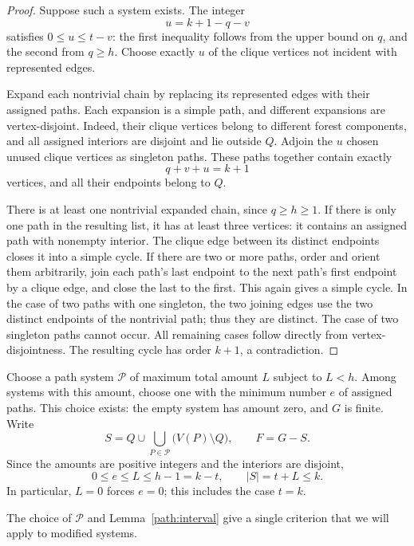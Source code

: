 \begin{proof}
Suppose such a system exists. The integer
\[
 u=k+1-q-v
\]
satisfies $0\leq u\leq t-v$: the first inequality follows from the upper
bound on $q$, and the second from $q\geq h$. Choose exactly $u$ of the
clique vertices not incident with represented edges.

Expand each nontrivial chain by replacing its represented edges with
their assigned paths. Each expansion is a simple path, and different
expansions are vertex-disjoint. Indeed, their clique vertices belong to
different forest components, and all assigned interiors are disjoint and
lie outside $Q$. Adjoin the $u$ chosen unused clique vertices as singleton
paths. These paths together contain exactly
\[
 q+v+u=k+1
\]
vertices, and all their endpoints belong to $Q$.

There is at least one nontrivial expanded chain, since $q\geq h\geq1$.
If there is only one path in the resulting list, it has at least three
vertices: it contains an assigned path with nonempty interior. The clique
edge between its distinct endpoints closes it into a simple cycle. If
there are two or more paths, order and orient them arbitrarily, join each
path's last endpoint to the next path's first endpoint by a clique edge,
and close the last to the first. This again gives a simple cycle. In the
case of two paths with one singleton, the two joining edges use the two
distinct endpoints of the nontrivial path; thus they are distinct. The
case of two singleton paths cannot occur. All remaining cases follow
directly from vertex-disjointness. The resulting cycle has order $k+1$,
a contradiction.
\end{proof}

Choose a path system $\mathcal P$ of maximum total amount $L$ subject to
$L<h$. Among systems with this amount, choose one with the minimum number
$e$ of assigned paths. This choice exists: the empty system has amount
zero, and $G$ is finite. Write
\begin{equation}\label{path:system-vertices}
 S=Q\cup\bigcup_{P\in\mathcal P}\bigl(V(P)\setminus Q\bigr),
 \qquad F=G-S.
\end{equation}
Since the amounts are positive integers and the interiors are disjoint,
\begin{equation}\label{path:budget}
 0\leq e\leq L\leq h-1=k-t,
 \qquad |S|=t+L\leq k.
\end{equation}
In particular, $L=0$ forces $e=0$; this includes the case $t=k$.

The choice of $\mathcal P$ and Lemma~\ref{path:interval} give a single
criterion that we will apply to modified systems.

